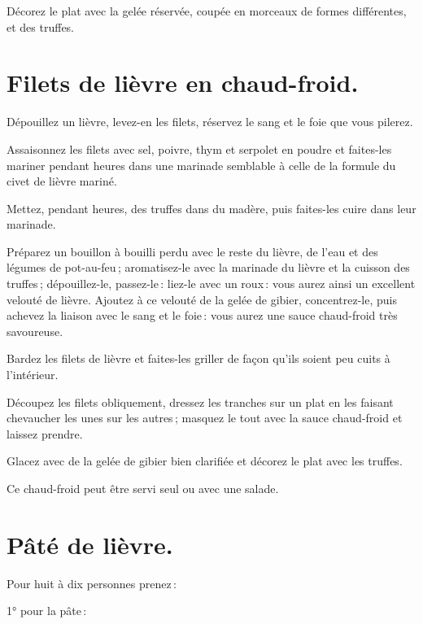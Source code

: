 Décorez le plat avec la gelée réservée, coupée en morceaux de formes différentes,
et des truffes.

\section*{\centering Filets de lièvre en chaud-froid.}
{}


Dépouillez un lièvre, levez-en les filets, réservez le sang et le foie que vous
pilerez.

Assaisonnez les filets avec sel, poivre, thym et serpolet en poudre et
faites-les mariner pendant {\ppp} heures dans une marinade semblable
à celle de la formule du civet de lièvre mariné.

Mettez, pendant {\mmm} heures, des truffes dans du madère, puis
faites-les cuire dans leur marinade.

Préparez un bouillon à bouilli perdu avec le reste du lièvre, de l'eau et des
légumes de pot-au-feu ; aromatisez-le avec la marinade du lièvre et la cuisson
des truffes ; dépouillez-le, passez-le : liez-le avec un roux : vous aurez
ainsi un excellent velouté de lièvre. Ajoutez à ce velouté de la gelée de
gibier, concentrez-le, puis achevez la liaison avec le sang et le foie : vous
aurez une sauce chaud-froid très savoureuse.

Bardez les filets de lièvre et faites-les griller de façon qu'ils soient peu
cuits à l'intérieur.

Découpez les filets obliquement, dressez les tranches sur un plat en les
faisant chevaucher les unes sur les autres ; masquez le tout avec la sauce
chaud-froid et laissez prendre.

Glacez avec de la gelée de gibier bien clarifiée et décorez le plat avec les truffes.

Ce chaud-froid peut être servi seul ou avec une salade.

\section*{\centering Pâté de lièvre.}
{}

Pour huit à dix personnes prenez :

1° pour la pâte :

